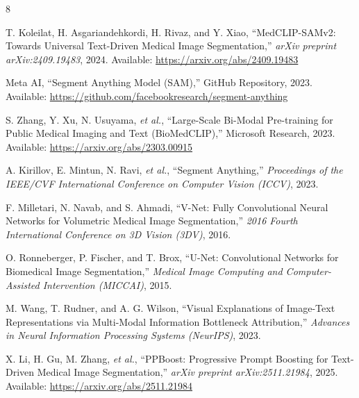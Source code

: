 \begin{thebibliography}{8}

T. Koleilat, H. Asgariandehkordi, H. Rivaz, and Y. Xiao,
``MedCLIP-SAMv2: Towards Universal Text-Driven Medical Image Segmentation,''
\textit{arXiv preprint arXiv:2409.19483}, 2024.
Available: \url{https://arxiv.org/abs/2409.19483}

Meta AI,
``Segment Anything Model (SAM),''
GitHub Repository, 2023.
Available: \url{https://github.com/facebookresearch/segment-anything}

S. Zhang, Y. Xu, N. Usuyama, \textit{et al.},
``Large-Scale Bi-Modal Pre-training for Public Medical Imaging and Text (BioMedCLIP),''
Microsoft Research, 2023.
Available: \url{https://arxiv.org/abs/2303.00915}

A. Kirillov, E. Mintun, N. Ravi, \textit{et al.},
``Segment Anything,''
\textit{Proceedings of the IEEE/CVF International Conference on Computer Vision (ICCV)}, 2023.

F. Milletari, N. Navab, and S. Ahmadi,
``V-Net: Fully Convolutional Neural Networks for Volumetric Medical Image Segmentation,''
\textit{2016 Fourth International Conference on 3D Vision (3DV)}, 2016.

O. Ronneberger, P. Fischer, and T. Brox,
``U-Net: Convolutional Networks for Biomedical Image Segmentation,''
\textit{Medical Image Computing and Computer-Assisted Intervention (MICCAI)}, 2015.

M. Wang, T. Rudner, and A. G. Wilson,
``Visual Explanations of Image-Text Representations via Multi-Modal Information Bottleneck Attribution,''
\textit{Advances in Neural Information Processing Systems (NeurIPS)}, 2023.

X. Li, H. Gu, M. Zhang, \textit{et al.},
``PPBoost: Progressive Prompt Boosting for Text-Driven Medical Image Segmentation,''
\textit{arXiv preprint arXiv:2511.21984}, 2025.
Available: \url{https://arxiv.org/abs/2511.21984}

\end{thebibliography}
